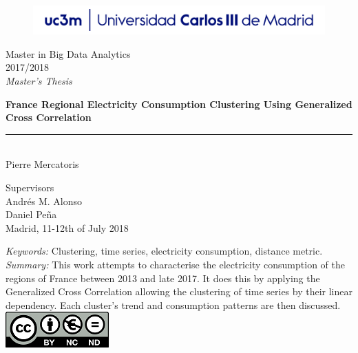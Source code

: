 \begin{titlepage}
\begin{sffamily}
\color{azulUC3M}
\begin{center}
\begin{figure}[htb]
\begin{center}
\vspace*{0.6cm}
\includegraphics[width=15cm]{./latex/imagenes/Portada_Logo.png}
\vspace*{1.6cm}
\end{center}
\end{figure}
\begin{LARGE}
Master in Big Data Analytics \\%
2017/2018 \\%
\vspace*{1cm}
\textsl{Master's Thesis}\\
\end{LARGE}
\Huge{\textbf{France Regional Electricity Consumption Clustering Using Generalized Cross Correlation}} %
\vspace*{1cm}
\rule{80mm}{0.1mm}\\
\huge{Pierre Mercatoris}\\ %
\vspace*{0.5cm}
\begin{Large}
Supervisors\\

Andrés M. Alonso\\
Daniel Peña\\
Madrid, 11-12th of July 2018\\
\end{Large}
\end{center}
\vspace*{1cm}
\color{black}
\emph{Keywords:} Clustering, time series, electricity consumption, distance metric. \\
\emph{Summary:} This work attempts to characterise the electricity consumption
of the regions of France between 2013 and late 2017. It does this by applying
the Generalized Cross Correlation allowing the clustering of time series by
their linear dependency. Each cluster's trend and consumption patterns are then discussed.\\
\includegraphics{./latex/imagenes/creativecommons.png}\\


\end{sffamily}
\end{titlepage}
